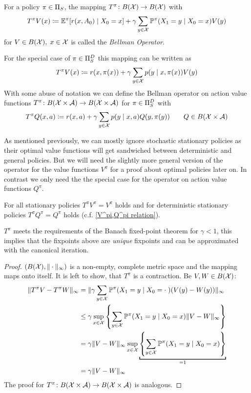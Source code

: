 \begin{definition}
	For a policy \(\pi\in\Pi_S\), the mapping \(T^\pi\colon B(\mathcal{X})\to B(\mathcal{X})\) with
	\[
		T^\pi V(x)\coloneqq \mathbb{E}^\pi[r(x,A_0)\mid X_0=x] 
		+ \gamma \sum_{y\in\mathcal{X}} \mathbb{P}^\pi(X_1=y\mid X_0=x) V(y)
	\]
	for \(V\in B(\mathcal{X}),\; x\in\mathcal{X}\) is called the \emph{Bellman Operator}.

	For the special case of \(\pi\in\Pi_S^D\) this mapping can be written as
	\[
		T^\pi V(x)\coloneqq r(x,\pi(x))+\gamma\sum_{y\in\mathcal{X}}p(y\mid x,\pi(x)) V(y)
	\]
	With some abuse of notation we can define the Bellman operator on action value functions \(T^\pi\colon B(\mathcal{X}\times\mathcal{A})\to B(\mathcal{X}\times\mathcal{A})\) for \(\pi\in\Pi_S^D\) with
	\[
		T^\pi Q(x,a)\coloneqq r(x,a)
		+\gamma\sum_{y\in\mathcal{X}}p(y\mid x,a) Q(y,\pi(y)) 
		\qquad Q\in B(\mathcal{X}\times\mathcal{A})
	\]	
\end{definition}
As mentioned previously, we can mostly ignore stochastic stationary policies as their optimal value functions will get sandwiched between deterministic and general policies. But we will need the slightly more general version of the operator for the value functions \(V^\pi\) for a proof about optimal policies later on. In contrast we only need the the special case for the operator on action value functions \(Q^\pi\).

\begin{remark}\label{T^pi unique}
	For all stationary policies \(T^\pi V^\pi=V^\pi \) holds and for deterministic stationary policies \(T^\pi Q^\pi=Q^\pi\) holds (c.f. \ref{V^pi,Q^pi relation}).

	\(T^\pi\) meets the requirements of the Banach fixed-point theorem  for \({\gamma<1}\), this implies that the fixpoints above are \emph{unique} fixpoints and can be approximated with the canonical iteration. 
\end{remark}

\begin{proof}
\((B(\mathcal{X}), \|\cdot\|_\infty)\) is a non-empty, complete metric space  and the mapping maps onto itself. It is left to show, that \(T^\pi\) is a contraction. Be \(V,W\in B(\mathcal{X})\):
\begin{align*}
	\|T^\pi V -T^\pi W\|_\infty 
	&=\|\gamma\sum_{y\in\cX} \Pr^\pi(X_1=y\mid X_0=\cdot\;) (V(y)-W(y))\|_\infty\\
	&\le\gamma \sup_{x\in\cX}\left\{ \sum_{y\in\cX} 
	\Pr^\pi(X_1=y\mid X_0=x) \|V-W\|_\infty \right\}\\
	&=\gamma \|V-W\|_\infty  \sup_{x\in\cX}\underbracket[1pt]{
		\left\{ \sum_{y\in\cX} \Pr^\pi(X_1=y\mid X_0=x) \right\}
	}_{=1}\\
	&=\gamma \|V-W\|_\infty
\end{align*}
The proof for \(T^\pi\colon B(\mathcal{X}\times\mathcal{A})\to B(\mathcal{X}\times\mathcal{A})\) is analogous.
\end{proof}

